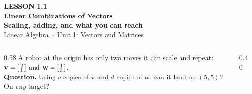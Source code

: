 \documentclass[aspectratio=169, 11pt]{beamer}
\newcommand{\vv}{\mathbf{v}}
\newcommand{\ww}{\mathbf{w}}
\begin{document}
{
\begin{frame}[plain]
  \vspace{2.8cm}\hspace{0.55cm}%
  \begin{minipage}{0.9\textwidth}
    {\color{goldacc}\bfseries\small LESSON 1.1}\\[0.5cm]
    {\color{white}\bfseries\LARGE Linear Combinations of Vectors}\\[0.3cm]
    {\color{white}\bfseries\large Scaling, adding, and what you can reach}\\[1.0cm]
    {\color{blushmid}\small Linear Algebra~$\cdot$~Unit 1: Vectors and Matrices}
  \end{minipage}
\end{frame}
}

\begin{frame}[t, plain]
  \begin{columns}[T]
    \begin{column}{0.58\textwidth}
      A robot at the origin has only two moves it can scale and repeat:
      $\vv=\begin{bsmallmatrix} 2\\1 \end{bsmallmatrix}$ and
      $\ww=\begin{bsmallmatrix} 1\\3 \end{bsmallmatrix}$.\\[8pt]
      \textbf{Question.} Using $c$ copies of $\vv$ and $d$ copies of $\ww$, can it land on
      $(5,5)$? On \emph{any} target?
    \end{column}
    \begin{column}{0.40\textwidth}
      \centering
    \end{column}
  \end{columns}
\end{frame}
\end{document}
